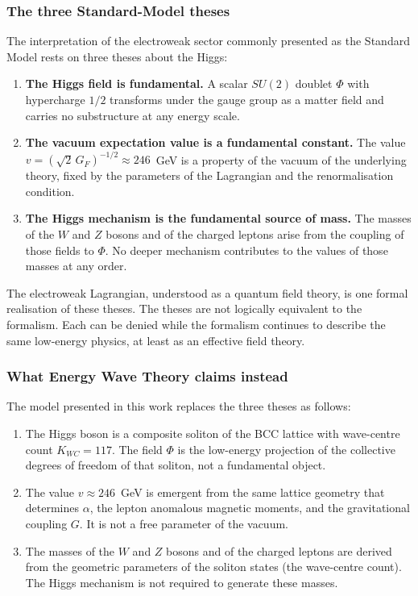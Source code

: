 \documentclass[10pt,a4paper]{article}
\begin{document}
\subsubsection*{The three Standard-Model theses}

The interpretation of the electroweak sector commonly presented as
the Standard Model rests on three theses about the Higgs:

\begin{enumerate}
	\item \textbf{The Higgs field is fundamental.}
	A scalar $SU(2)$ doublet $\Phi$ with hypercharge $1/2$ transforms
	under the gauge group as a matter field and carries no
	substructure at any energy scale.
	
	\item \textbf{The vacuum expectation value is a fundamental
		constant.}
	The value $v = (\sqrt{2}\,G_F)^{-1/2} \approx 246$~GeV is a
	property of the vacuum of the underlying theory, fixed by the
	parameters of the Lagrangian and the renormalisation condition.
	
	\item \textbf{The Higgs mechanism is the fundamental source of
		mass.}
	The masses of the $W$ and $Z$ bosons and of the charged leptons
	arise from the coupling of those fields to $\Phi$. No deeper
	mechanism contributes to the values of those masses at any
	order.
\end{enumerate}

The electroweak Lagrangian, understood as a quantum field theory,
is one formal realisation of these theses. The theses are not
logically equivalent to the formalism. Each can be denied while the
formalism continues to describe the same low-energy physics, at
least as an effective field theory.

\subsubsection*{What Energy Wave Theory claims instead}

The model presented in this work replaces the three theses as
follows:

\begin{enumerate}
	\item The Higgs boson is a composite soliton of the BCC lattice
	with wave-centre count $K_{WC} = 117$. The field $\Phi$ is the
	low-energy projection of the collective degrees of freedom of
	that soliton, not a fundamental object.
	
	\item The value $v \approx 246$~GeV is emergent from the same
	lattice geometry that determines $\alpha$, the lepton anomalous
	magnetic moments, and the gravitational coupling $G$. It is not
	a free parameter of the vacuum.
	
	\item The masses of the $W$ and $Z$ bosons and of the charged
	leptons are derived from the geometric parameters of the soliton
	states (the wave-centre count). The
	Higgs mechanism is not required to generate these masses.
\end{enumerate}
\end{document}
